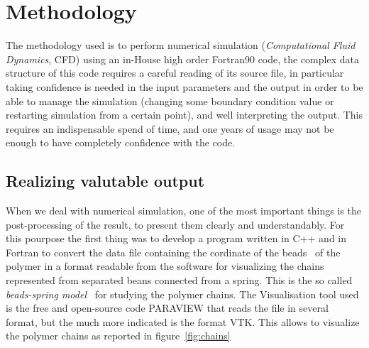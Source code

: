\chapter{Methodology}\label{chap_methodology}




The methodology used is to perform numerical simulation (\textit{Computational Fluid Dynamics}, CFD) using 
an in-House high order Fortran90 code, the complex data structure of this code requires a careful reading of its source file, in particular taking confidence is needed in the input parameters and the output in order to be able to manage the simulation (changing some boundary condition value or restarting simulation from a certain point), and well interpreting the output.  %
This requires an indispensable spend of time, and one years of usage may not be enough to have completely confidence 
with the code.

\section{Realizing valutable output}

When we deal with numerical simulation, one of the most important things is the post-processing of the result,
to present them clearly and understandably. For this pourpose the first thing was to develop a program written in C++ and in Fortran to convert the data file containing the cordinate of the beads~\cite{pp} 
of the polymer in a format readable from the software for visualizing the chains represented from separated beans connected from a spring. This is the so called \textit{beads-spring model}~\cite{pp} 
for studying the polymer chains. The Visualisation tool used is the free and open-source code PARAVIEW that reads the file in several format, but the much more indicated is the format VTK. This allows to visualize the polymer chains as reported in figure~\ref{fig:chains}

